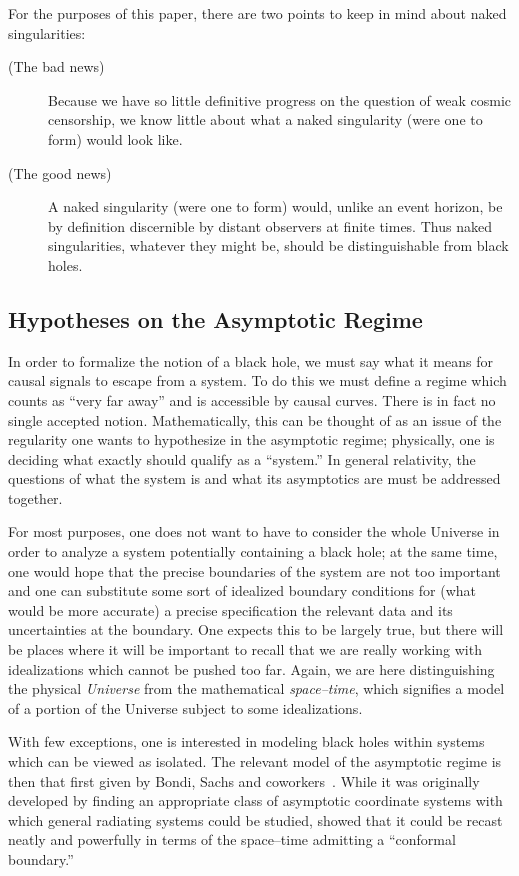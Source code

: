 \documentclass[
%
draft    %
,numberedheadings 
,bibliocites
  ]
  {aipproc}
\begin{document}
For the purposes of this paper, there are two points to keep in mind about naked singularities:
\begin{description}
\item[(The bad news)]  Because we have so little definitive progress on the question of weak cosmic censorship, we know little about what a naked singularity (were one to form) would look like.

\item[(The good news)]  A naked singularity (were one to form) would, unlike an event horizon, be by definition discernible by distant observers at finite times.  Thus naked singularities, whatever they might be, should be distinguishable from black holes.

\end{description}

\subsection{Hypotheses on the Asymptotic Regime}

In order to formalize the notion of a black hole, we must say what it means for causal signals to escape from a system. 
 To do this we must define a regime which counts as ``very far away'' and is accessible by causal curves.  There is in fact no single accepted notion.  Mathematically, this can be thought of as an issue of the regularity one wants to  hypothesize in the asymptotic regime; physically, one is deciding what exactly should qualify as a ``system.''  In general relativity, the questions of what the system is and what its asymptotics are must be addressed together.

For most purposes, one does not want to have to consider the whole Universe in order to analyze a system potentially containing a black hole; at the same time, one would hope that the precise boundaries of the system are not too important and one can substitute some sort of idealized boundary conditions for (what would be more accurate) a precise specification the relevant data and its uncertainties at the boundary.  One expects this to be largely true, but there will be places where it will be important to recall that we are really working with idealizations which cannot be pushed too far.  Again, we are here distinguishing the physical {\em Universe} from the mathematical {\em space--time}, which signifies a model of a portion of the Universe subject to some idealizations.

With few exceptions, one is interested in modeling black holes within systems which can be viewed as isolated.  The relevant model of the asymptotic regime is then that first given by Bondi, Sachs and coworkers~\citep{Bondi:1962,Sachs:1962}.
While it was 
originally developed by finding an appropriate class of asymptotic coordinate systems with which general radiating systems could be studied, \citet{Penrose:1964} showed that it could be recast neatly and powerfully in terms of the space--time admitting a ``conformal boundary.'' 
\end{document}
